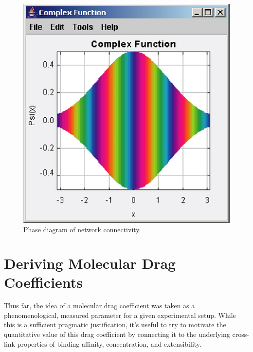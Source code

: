\documentclass[pre,reprint]{revtex4-1}
\begin{document}
\begin{figure}[h!]
\centering
\includegraphics[scale=0.6]{phase}
\caption{\label{fig:sim}Phase diagram of network connectivity.}
\end{figure}

































\appendix
\addappheadtotoc

\section{Deriving Molecular Drag Coefficients}
\label{app:drag}
Thus far, the idea of a molecular drag coefficient was taken as a phenomenological, measured parameter for a given experimental setup.  While this is a sufficient pragmatic justification, it's useful to try to motivate the quantitative value of this drag coefficient by connecting it to the underlying cross-link properties of binding affinity, concentration, and extensibility.
\end{document}
